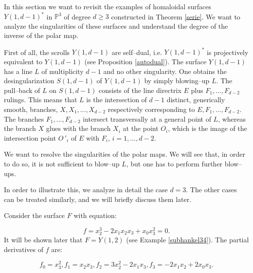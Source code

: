 \documentclass[11pt]{article}   %
\theoremstyle{definition}
\numberwithin{Theorem}{section} \numberwithin{equation}{section}
\newcommand{\p}{{\mathbb P}}
\begin{document}
{In this section we want to revisit the examples of homaloidal
surfaces $Y(1,d-1)^ *$ in $\p^ 3$ of degree $d\geq 3$ constructed in
Theorem \ref {serie}. We want to  analyze the singularities of these
surfaces and understand the degree of the inverse of the polar map.

First of all,  the scrolls $Y(1,d-1)$ are self--dual, i.e.
$Y(1,d-1)^*$ is projectively equivalent to $Y(1,d-1)$ (see
Proposition \ref {autodual}). The surface $Y(1,d-1)$ has a line $L$
of multiplicity $d-1$ and no other singularity. One obtains the
desingularization $S(1,d-1)$ of $Y(1,d-1)$ by simply blowing--up
$L$. The pull--back of $L$ on $S(1,d-1)$ consists of the line
directrix $E$ plus $F_1,...,F_{d-2}$ rulings. This means that $L$ is
the intersection of $d-1$ distinct, generically smooth, branches,
$X, X_1,...,X_{d-2}$ respectively corresponding to $E,
F_1,...,F_{d-2}$. The branches $F_1,...,F_{d-2}$ intersect
transversally at a general point of $L$, whereas the branch $X$
glues with the branch $X_i$ at the point $O_i$, which is the image
of the intersection point $O\,'_i$ of $E$ with $F_i$, $i=1,...,d-2$.

We want to resolve the singularities of
the polar maps. We will see that, in order to do so, it is not sufficient
to blow--up $L$, but one has to perform further blow--ups.

In order to illustrate this, we analyze in detail the case $d=3$.
The other cases can be treated similarly, and we will briefly
discuss them later.

Consider the surface $F$ with equation:

$$f=x_2^ 3-2x_1x_2x_3+x_0x_3^ 2=0.$$
It will be shown later that $F=Y(1,2)$ (see Example \ref {subhankel34}). The partial derivatives of
$f$ are:

$$f_0=x_3^ 2, f_1=x_2x_3, f_2=3x_2^ 2-2x_1x_3, f_3=-2x_1x_2+2x_0x_3.$$

}
\end{document}
